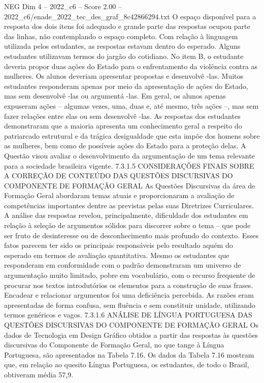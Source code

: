 \begin{textsample}{NEG Dim 4 – 2022\_c6 – Score 2.00 – 2022\_c6/enade\_2022\_tec\_des\_graf\_8c42866294.txt}
O espaço disponível para a resposta dos dois itens foi adequado e grande parte das respostas ocupou parte das linhas, não contemplando o espaço completo.
Com relação à linguagem utilizada pelos estudantes, as respostas estavam dentro do esperado.
Alguns estudantes utilizavam termos do jargão do cotidiano.
No item B, o estudante deveria propor duas ações do Estado para o enfrentamento da violência contra as mulheres.
Os alunos deveriam apresentar propostas e desenvolvê -las.
Muitos estudantes responderam apenas por meio da apresentação de ações do Estado, mas sem desenvolvê -las ou argumentá -las.
Em geral, os alunos apenas expuseram ações – algumas vezes, uma, duas e, até mesmo, três ações –, mas sem fazer relações entre elas ou sem desenvolvê -las.
As respostas dos estudantes demonstraram que a maioria apresenta um conhecimento geral a respeito do patriarcado estrutural e da trágica desigualdade que esta impõe dos homens sobre as mulheres, bem como de possíveis ações do Estado para a proteção delas.
A Questão visou avaliar o desenvolvimento da argumentação de um tema relevante para a sociedade brasileira vigente. 7.3.1.5 CONSIDERAÇÕES FINAIS SOBRE A CORREÇÃO DE CONTEÚDO DAS QUESTÕES DISCURSIVAS DO COMPONENTE DE FORMAÇÃO GERAL As Questões Discursivas da área de Formação Geral abordaram temas atuais e proporcionaram a avaliação de competências importantes dentre as previstas pelas suas Diretrizes Curriculares.
A análise das respostas revelou, principalmente, dificuldade dos estudantes em relação à seleção de argumentos sólidos para discorrer sobre o tema – que pode ser fruto de desinteresse ou de desconhecimento mais profundo do contexto.
Esses fatos parecem ter sido os principais responsáveis pelo resultado aquém do esperado em termos de avaliação quantitativa.
Mesmo os estudantes que responderam em conformidade com o padrão demonstraram um universo de argumentação muito limitado, pobre em vocabulário, com o recurso frequente de procurar nos textos introdutórios os elementos para a construção de suas frases.
Encadear e relacionar argumentos foi uma deficiência percebida.
As razões eram apresentadas de forma confusa, sem fluência e sem constituir unidade, utilizando termos genéricos e vagos. 7.3.1.6 ANÁLISE DE LÍNGUA PORTUGUESA DAS QUESTÕES DISCURSIVAS DO COMPONENTE DE FORMAÇÃO GERAL Os dados de Tecnologia em Design Gráfico obtidos a partir das respostas às questões discursivas do Componente de Formação Geral, no que tange à Língua Portuguesa, são apresentados na Tabela 7.16.
Os dados da Tabela 7.16 mostram que, em relação ao quesito Língua Portuguesa, os estudantes, de todo o Brasil, obtiveram média 57,9.

\end{textsample}
